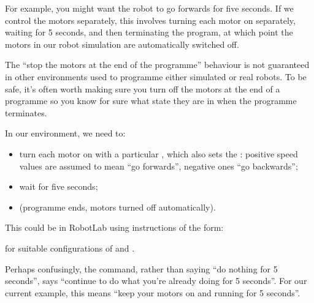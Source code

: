 \documentclass[letterpaper,10pt,english]{sphinxmanual}
\begin{document}
For example, you might want the robot to go forwards for five seconds. If we control the motors separately, this involves turning each motor on separately, waiting for 5 seconds, and then terminating the program, at which point the motors in our robot simulation are automatically switched off.



The “stop the motors at the end of the programme” behaviour is not guaranteed in other environments used to programme either simulated or real robots. To be safe, it’s often worth making sure you turn off the motors at the end of a programme so you know for sure what state they are in when the programme terminates.



In our environment, we need to:
\begin{itemize}
\item {} 
turn each motor on with a particular , which also sets the : positive speed values are assumed to mean “go forwards”, negative ones “go backwards”;

\item {} 
wait for five seconds;

\item {} 
(programme ends, motors turned off automatically).

\end{itemize}

This could be  in RobotLab using instructions of the form:

\begin{sphinxVerbatim}[commandchars=\\\{\}]

\end{sphinxVerbatim}

for suitable configurations of  and .

Perhaps confusingly, the  command, rather than saying “do nothing for 5 seconds”, says “continue to do what you’re already doing for 5 seconds”. For our current example, this means “keep your motors on and running for 5 seconds”.
\end{document}

